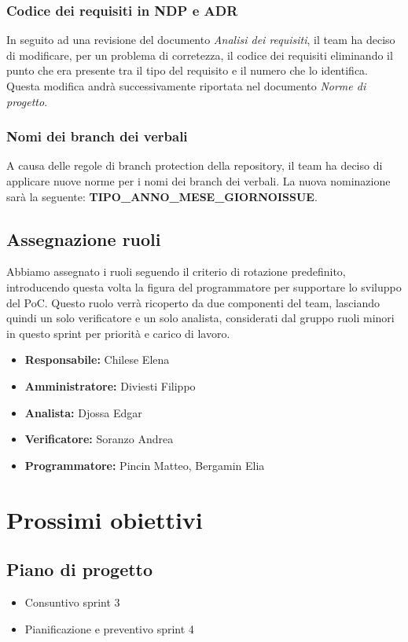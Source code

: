 \subsubsection{Codice dei requisiti in NDP e ADR}
In seguito ad una revisione del documento \textit{Analisi dei requisiti}, il team ha deciso di modificare, per un problema di corretezza, il codice dei requisiti eliminando il punto che era presente tra il tipo del requisito e il numero che lo identifica.
Questa modifica andrà successivamente riportata nel documento \textit{Norme di progetto}.

\subsubsection{Nomi dei branch dei verbali}
A causa delle regole di branch protection della repository, il team ha deciso di applicare nuove norme per i nomi dei branch dei verbali.
La nuova nominazione sarà la seguente: \textbf{TIPO\_ANNO\_MESE\_GIORNO\-ISSUE}.

\subsection{Assegnazione ruoli}
Abbiamo assegnato i ruoli seguendo il criterio di rotazione predefinito, introducendo questa volta la figura del programmatore per supportare lo sviluppo del PoC.
Questo ruolo verrà ricoperto da due componenti del team, lasciando quindi un solo verificatore e un solo analista, considerati dal gruppo ruoli minori in questo sprint per priorità e carico di lavoro.
\begin{itemize}
    \item \textbf{Responsabile:} Chilese Elena
    \item \textbf{Amministratore:} Diviesti Filippo
    \item \textbf{Analista:} Djossa Edgar
    \item \textbf{Verificatore:} Soranzo Andrea
    \item \textbf{Programmatore:} Pincin Matteo, Bergamin Elia
\end{itemize}

\section{Prossimi obiettivi}

\subsection{Piano di progetto}
\begin{itemize}
    \item Consuntivo sprint 3
    \item Pianificazione e preventivo sprint 4
\end{itemize}

